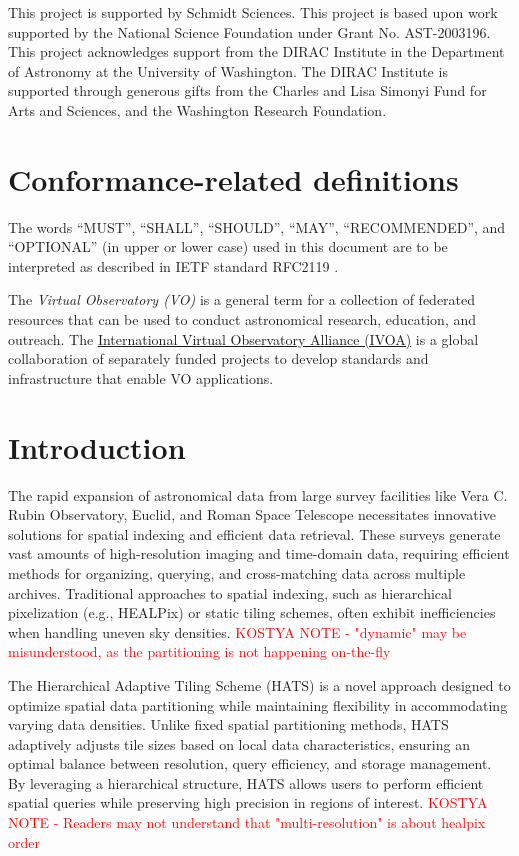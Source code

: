 \documentclass[11pt,a4paper]{ivoa}
\begin{document}
This project is supported by Schmidt Sciences.
This project is based upon work supported by the National Science Foundation under Grant No. AST-2003196.
This project acknowledges support from the DIRAC Institute in the Department of Astronomy at the University of Washington. The DIRAC Institute is supported through generous gifts from the Charles and Lisa Simonyi Fund for Arts and Sciences, and the Washington Research Foundation.


\section*{Conformance-related definitions}
The words ``MUST'', ``SHALL'', ``SHOULD'', ``MAY'', ``RECOMMENDED'', and
``OPTIONAL'' (in upper or lower case) used in this document are to be
interpreted as described in IETF standard RFC2119 \citep{std:RFC2119}.

The \emph{Virtual Observatory (VO)} is a
general term for a collection of federated resources that can be used
to conduct astronomical research, education, and outreach.
The \href{https://www.ivoa.net}{International
Virtual Observatory Alliance (IVOA)} is a global
collaboration of separately funded projects to develop standards and
infrastructure that enable VO applications.

\section{Introduction}
The rapid expansion of astronomical data from large survey facilities like Vera C. Rubin Observatory, Euclid, and Roman Space Telescope necessitates innovative solutions for spatial indexing and efficient data retrieval. 
These surveys generate vast amounts of high-resolution imaging and time-domain data, requiring efficient methods for organizing, querying, and cross-matching data across multiple archives. 
Traditional approaches to spatial indexing, such as hierarchical pixelization (e.g., HEALPix) or static tiling schemes, often exhibit inefficiencies when handling uneven sky densities.
\textcolor{red}{KOSTYA NOTE - "dynamic" may be misunderstood, as the partitioning is not happening on-the-fly}

The Hierarchical Adaptive Tiling Scheme (HATS) is a novel approach designed to optimize spatial data partitioning while maintaining flexibility in accommodating varying data densities. 
Unlike fixed spatial partitioning methods, HATS adaptively adjusts tile sizes based on local data characteristics, ensuring an optimal balance between resolution, query efficiency, and storage management. 
By leveraging a hierarchical structure, HATS allows users to perform efficient spatial queries while preserving high precision in regions of interest.
\textcolor{red}{KOSTYA NOTE - Readers may not understand that "multi-resolution" is about healpix order}
\end{document}
